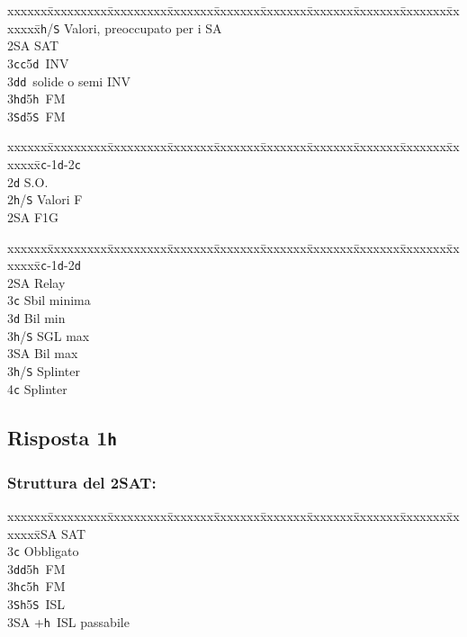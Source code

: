 \documentclass[a4paper,italian]{article}
\newcommand{\BS}{\small{\texttt{S}}}
\newcommand{\BC}{\small{\texttt{c}}}
\newcommand{\BD}{\small{\texttt{d}}}
\newcommand{\BH}{\small{\texttt{h}}}
\newcommand{\pdfh}{\texorpdfstring{\texttt{h}}{H}}
\newenvironment{bidtable}
{\begin{tabbing}

    xxxxxx\=xxxxxxxxx\=xxxxxxxxx\=xxxxxxx\=xxxxxxx\=xxxxxxx\=xxxxxxx\=xxxxxxx\=xxxxxxx\=xxxxxxx\=\kill}
{\end{tabbing} }%
\begin{document}
\begin{multicols}{2}
\begin{bidtable}
        [2pt]2\BH/\BS \> Valori, preoccupato per i SA\\
        2\small{SA} \small{SA}T\\
        3\BC {}\BC 5\BD\ INV\\
        3\BD {}\BD\ solide o semi INV\\
        3\BH {}\BD 5\BH\ FM\\
        3\BS {}\BD 5\BS\ FM\-
    \end{bidtable}
    \bigbreak
    \begin{bidtable}
        1\BC-1\BD-2\BC\+\\
        2\BD \> S.O.\\
        2\BH/\BS \> Valori F\\
        2\small{SA} \> F1G\-
    \end{bidtable}
    \bigbreak
    \begin{bidtable}
        1\BC-1\BD-2\BD\+\\
        2\small{SA} \> Relay\+\\
        3\BC \> Sbil minima\\
        3\BD \> Bil min\\
        3\BH/\BS \> SGL max\\
        3\small{SA} \> Bil max\-\\
        3\BH/\BS \> Splinter\\
        4\BC \> Splinter\-
    \end{bidtable}

    \subsection{Risposta 1\pdfh}

    \subsubsection{Struttura del 2\small{SA}T:}

    \begin{bidtable}
        2\small{SA} \small{SA}T\+\\
        3\BC \> Obbligato\+\\
        3\BD {}\BD 5\BH\ FM\\
        3\BH {}\BC 5\BH\ FM\\
        3\BS {}\BH 5\BS\ ISL\\
        3\small{SA} +\BH\ ISL passabile\-\-
    \end{bidtable}


\end{multicols}
\end{document}
